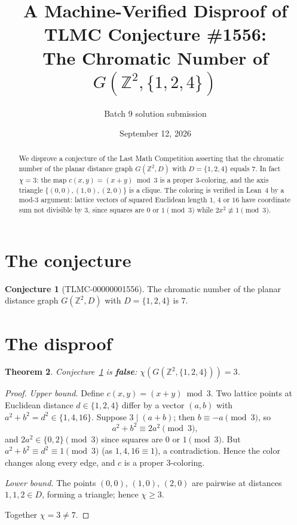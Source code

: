 \documentclass[11pt]{article}
\title{A Machine-Verified Disproof of TLMC Conjecture \#1556:\\ The Chromatic Number of $G(\mathbb{Z}^2, \{1,2,4\})$}
\author{Batch 9 solution submission}
\date{September 12, 2026}
\newtheorem{theorem}{Theorem}[section]
\theoremstyle{definition}
\newtheorem{conjecture}[theorem]{Conjecture}
\theoremstyle{remark}
\begin{document}
\maketitle

\begin{abstract}
We disprove a conjecture of the Last Math Competition asserting that the chromatic number of the planar distance graph $G(\mathbb{Z}^2, D)$ with $D = \{1, 2, 4\}$ equals $7$. In fact $\chi = 3$: the map $c(x,y) = (x+y) \bmod 3$ is a proper $3$-coloring, and the axis triangle $\{(0,0),(1,0),(2,0)\}$ is a clique. The coloring is verified in Lean~4 by a mod-$3$ argument: lattice vectors of squared Euclidean length $1$, $4$ or $16$ have coordinate sum not divisible by $3$, since squares are $0$ or $1 \pmod 3$ while $2x^2 \not\equiv 1 \pmod 3$.
\end{abstract}

\section{The conjecture}

\begin{conjecture}[TLMC-00000001556]\label{conj:1556}
The chromatic number of the planar distance graph $G(\mathbb{Z}^2, D)$ with $D = \{1, 2, 4\}$ is $7$.
\end{conjecture}

\section{The disproof}

\begin{theorem}\label{thm:1556}
Conjecture~\ref{conj:1556} is \textbf{false}: $\chi(G(\mathbb{Z}^2, \{1,2,4\})) = 3$.
\end{theorem}

\begin{proof}
\emph{Upper bound.} Define $c(x, y) = (x + y) \bmod 3$. Two lattice points at Euclidean distance $d \in \{1,2,4\}$ differ by a vector $(a,b)$ with $a^2 + b^2 = d^2 \in \{1, 4, 16\}$. Suppose $3 \mid (a+b)$; then $b \equiv -a \pmod 3$, so
\[
a^2 + b^2 \equiv 2a^2 \pmod 3,
\]
and $2a^2 \in \{0, 2\} \pmod 3$ since squares are $0$ or $1 \pmod 3$. But $a^2 + b^2 \equiv d^2 \equiv 1 \pmod 3$ (as $1, 4, 16 \equiv 1$), a contradiction. Hence the color changes along every edge, and $c$ is a proper $3$-coloring.

\emph{Lower bound.} The points $(0,0)$, $(1,0)$, $(2,0)$ are pairwise at distances $1, 1, 2 \in D$, forming a triangle; hence $\chi \ge 3$.

Together $\chi = 3 \ne 7$.
\end{proof}
\end{document}
